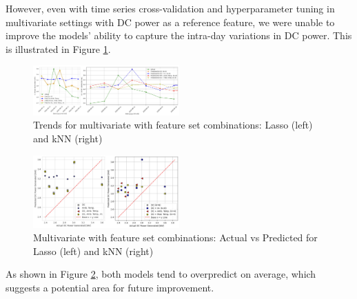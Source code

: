 However, even with time series cross-validation and hyperparameter tuning in multivariate settings with DC power as a reference feature, we were unable to improve the models' ability to capture the intra-day variations in DC power. This is illustrated in Figure \ref{fig:hourDCF}.

\begin{figure}[h]
    \centering
    \includegraphics[width=0.5\textwidth]{Figures/hourDCF.png}
    \caption{Trends for multivariate with feature set combinations: Lasso (left) and kNN (right)}
    \label{fig:hourDCF}
\end{figure}

\begin{figure}[h]
    \centering
    \includegraphics[width=0.5\textwidth]{Figures/multi_pred_vs_actual.jpg}
    \caption{Multivariate with feature set combinations: Actual vs Predicted for Lasso (left) and kNN (right)}
    \label{fig:multi-pred-actual}
\end{figure}

As shown in Figure \ref{fig:multi-pred-actual}, both models tend to overpredict on average, which suggests a potential area for future improvement.

